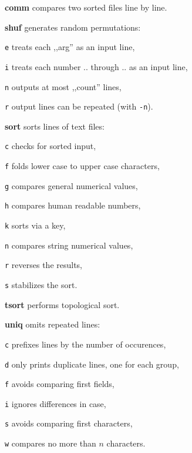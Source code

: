 \begin{enumx}
	\item [\cmdblack] \textbf{comm} compares two sorted files line by line.
	\item [\cmdblack] \textbf{shuf} generates random permutations:
	\item [\texttt{e}] treats each ,,arg'' as an input line,
	\item [\texttt{i}] treats each number .. through .. as an input line, 
	\item [\texttt{n}] outputs at most ,,count'' lines,
	\item [\texttt{r}] output lines can be repeated (with \texttt{-n}).
	\item [\cmdblack] \textbf{sort} sorts lines of text files:
	\item [\texttt{c}] checks for sorted input,
	\item [\texttt{f}] folds lower case to upper case characters,
	\item [\texttt{g}] compares general numerical values,
	\item [\texttt{h}] compares human readable numbers,
	\item [\texttt{k}] sorts via a key,
	\item [\texttt{n}] compares string numerical values,
	\item [\texttt{r}] reverses the results,
	\item [\texttt{s}] stabilizes the sort.
	\item [\cmdblack] \textbf{tsort} performs topological sort.
	\item [\cmdblack] \textbf{uniq} omits repeated lines:
	\item [\texttt{c}] prefixes lines by the number of occurences,
	\item [\texttt{d}] only prints duplicate lines, one for each group,
	\item [\texttt{f}] avoids comparing first fields,
	\item [\texttt{i}] ignores differences in case,
	\item [\texttt{s}] avoids comparing first characters,
	\item [\texttt{w}] compares no more than $n$ characters.
\end{enumx}

